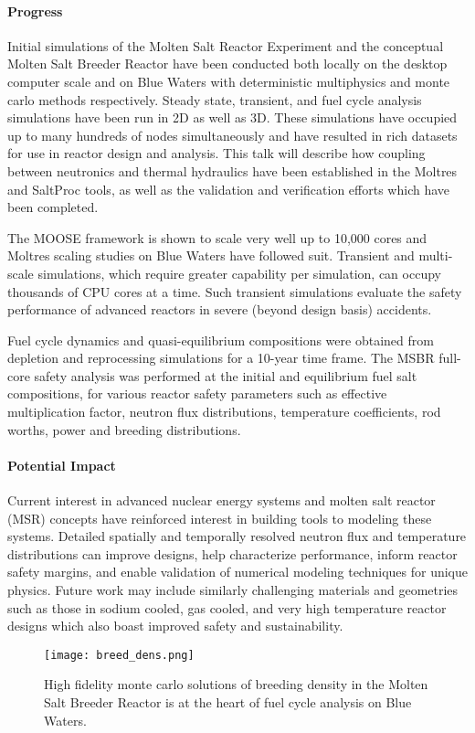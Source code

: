 \documentclass[11pt]{article}
\begin{document}
\paragraph{Progress}

Initial simulations of the Molten Salt Reactor Experiment and the conceptual 
Molten Salt Breeder Reactor have been conducted both locally on the desktop
computer scale and on Blue Waters with deterministic multiphysics and monte 
carlo methods respectively. Steady state, transient, and fuel cycle analysis 
simulations have been run in 2D as well as 3D. These simulations
have occupied up to many hundreds of nodes simultaneously and have resulted in 
rich datasets for use in reactor design and analysis. This talk will
describe how coupling between neutronics and thermal hydraulics have been
established in the Moltres and SaltProc tools, as well as the validation 
and verification efforts which have been completed.

The MOOSE framework is shown to scale very well up to 10,000 cores and Moltres 
scaling studies on Blue Waters have followed suit.
Transient and multi-scale simulations, which require greater capability per
simulation, can occupy thousands of CPU cores at a time. Such transient
simulations evaluate the safety performance of advanced reactors in severe
(beyond design basis) accidents.


Fuel cycle dynamics and quasi-equilibrium compositions were obtained 
from depletion and reprocessing simulations for a 10-year time frame. The 
MSBR full-core safety analysis was performed at the initial and equilibrium 
fuel salt compositions, for various reactor safety parameters such as effective 
multiplication factor, neutron flux distributions, temperature coefficients, 
rod worths, power and breeding distributions.


\paragraph{Potential Impact}
Current interest in advanced nuclear energy systems and molten salt reactor 
(MSR) concepts have reinforced interest in building tools to modeling these 
systems.  Detailed spatially and temporally resolved neutron flux and 
temperature distributions can improve designs, help characterize performance, 
inform reactor safety margins, and enable validation of numerical modeling 
techniques for unique physics.  Future work may include similarly challenging 
materials and geometries such as those in sodium cooled, gas cooled, and very 
high temperature reactor designs which also boast improved safety and 
sustainability.  

\begin{figure}[ht]
        \begin{center}
                \texttt{[image: breed\_dens.png]}
        \end{center}
        \caption{High fidelity monte carlo solutions of breeding density in the
                Molten Salt Breeder Reactor is at the heart of fuel cycle 
        analysis on Blue Waters.}
        \label{fig:breed_dens}
\end{figure}
\end{document}
